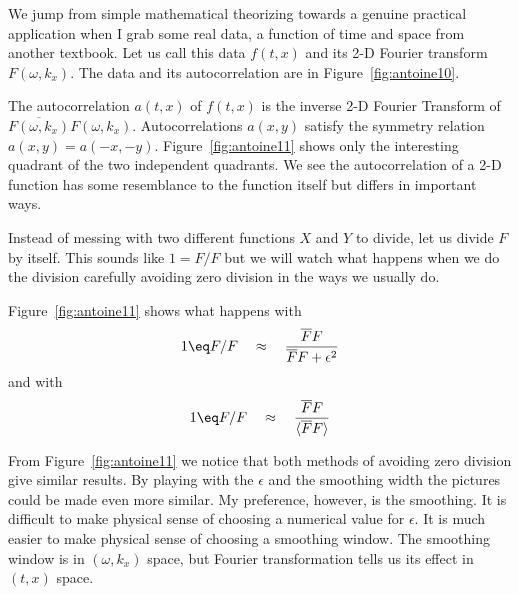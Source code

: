 
\par
We jump from simple mathematical theorizing
towards a genuine practical application when I grab some real data,
a function of time and space from another textbook.
Let us call this data $f(t,x)$ and its 2-D Fourier transform
$F(\omega, k_x)$.
The data and its autocorrelation are in Figure~\ref{fig:antoine10}.

\par
{}
\par
The autocorrelation $a(t,x)$ of $f(t,x)$ is
the inverse 2-D Fourier Transform  of 
$ \overline{F(\omega, k_x)} F(\omega, k_x)$.
Autocorrelations $a(x,y)$
satisfy the symmetry relation
$a(x,y)=a(-x,-y)$.
Figure~\ref{fig:antoine11}
shows only the interesting quadrant of the two independent quadrants.
We see the autocorrelation of a 2-D function has some
resemblance to the function itself but differs in important ways.

\par
Instead of messing with two different functions $X$ and $Y$ to divide,
let us divide $F$ by itself.
This sounds like $1=F/F$ but we will
watch what happens when we do the division carefully
avoiding zero division in the ways we usually do.
\par
Figure~\ref{fig:antoine11} shows
what happens with
\begin{equation}
\label{eqn:z7}
1 \eq F/F \quad\approx\quad {
	{
	\overline{F} F
	}\over{
	\overline{F} F + \epsilon^2
	}
}
\end{equation}
and with
\begin{equation}
\label{eqn:z8}
1 \eq F/F \quad\approx\quad {
	{
	\overline{F} F
	}\over{
	\langle \overline{F} F \rangle
	}
}
\end{equation}

From Figure~\ref{fig:antoine11} we notice that both methods of
avoiding zero division give similar results.
By playing with the $\epsilon$ and the smoothing width
the pictures could be made even more similar.
My preference, however, is the smoothing.
It is difficult to make physical sense of choosing a numerical value
for $\epsilon$.
It is much easier to make physical sense of choosing a smoothing window.
The smoothing window is in $(\omega,k_x)$ space,
but Fourier transformation tells us its effect in $(t,x)$ space.

